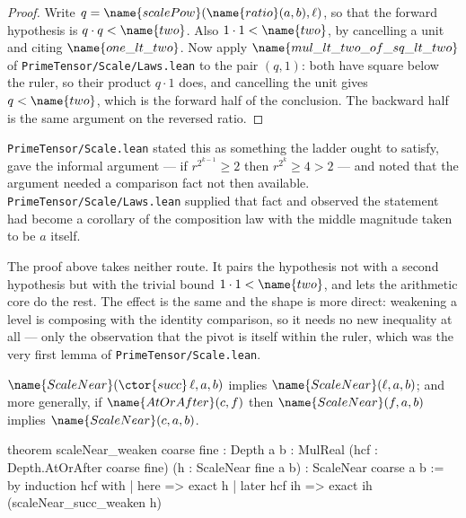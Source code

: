 \begin{proof}
Write $q = \name{scalePow}(\name{ratio}(a,b), \ell)$, so that the forward
hypothesis is $q \cdot q < \name{two}$.  Also $1 \cdot 1 < \name{two}$, by
cancelling a unit and citing $\name{one\_lt\_two}$.  Now apply
$\name{mul\_lt\_two\_of\_sq\_lt\_two}$ of
\texttt{PrimeTensor/Scale/Laws.lean} to the pair $(q, 1)$: both have square
below the ruler, so their product $q \cdot 1$ does, and cancelling the unit
gives $q < \name{two}$, which is the forward half of the conclusion.  The
backward half is the same argument on the reversed ratio.
\end{proof}

\begin{remark}
\label{Analysis:Control:rem:monotone}
\texttt{PrimeTensor/Scale.lean} stated this as something the ladder ought to
satisfy, gave the informal argument --- if $r^{2^{k-1}} \geq 2$ then
$r^{2^{k}} \geq 4 > 2$ --- and noted that the argument needed a comparison fact
not then available.  \texttt{PrimeTensor/Scale/Laws.lean} supplied that fact
and observed the statement had become a corollary of the composition law with
the middle magnitude taken to be $a$ itself.

The proof above takes neither route.  It pairs the hypothesis not with a second
hypothesis but with the trivial bound $1 \cdot 1 < \name{two}$, and lets the
arithmetic core do the rest.  The effect is the same and the shape is more
direct: weakening a level is composing with the identity comparison, so it
needs no new inequality at all --- only the observation that the pivot is
itself within the ruler, which was the very first lemma of
\texttt{PrimeTensor/Scale.lean}.
\end{remark}

\begin{lemma}
\label{Analysis:Control:lem:weaken-real}
$\name{ScaleNear}(\ctor{succ}\,\ell, a, b)$ implies
$\name{ScaleNear}(\ell, a, b)$; and more generally, if
$\name{AtOrAfter}(c, f)$ then $\name{ScaleNear}(f,a,b)$ implies
$\name{ScaleNear}(c,a,b)$.
\end{lemma}

\begin{leancode}
theorem scaleNear_weaken {coarse fine : Depth} {a b : MulReal}
    (hcf : Depth.AtOrAfter coarse fine)
    (h : ScaleNear fine a b) :
    ScaleNear coarse a b := by
  induction hcf with
  | here =>
      exact h
  | later hcf ih =>
      exact ih (scaleNear_succ_weaken h)
\end{leancode}

